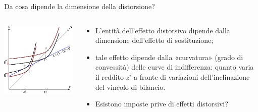 \documentclass[aspectratio=64,12pt]{beamer}
\begin{document}
\begin{frame}{Da cosa dipende la dimensione della distorsione?}
\begin{columns}
\begin{column}{.55\columnwidth}
\begin{center}
\includegraphics[width=\textwidth]{./figure/effetto-distorsivo-imposte-ql-color-8.pdf}
\end{center}
\end{column}


\begin{column}{.45\columnwidth}
\begin{itemize}
\item L'entità dell'effetto distorsivo dipende dalla dimensione dell'effetto di sostituzione;
\item tale effetto dipende dalla «curvatura» (grado di convessità) delle curve di indifferenza: quanto varia il reddito $z^i$ a fronte di variazioni dell'inclinazione del vincolo di bilancio.
\item Esistono imposte prive di effetti distorsivi?
\end{itemize}
\end{column}
\end{columns}
\end{frame}
\end{document}
